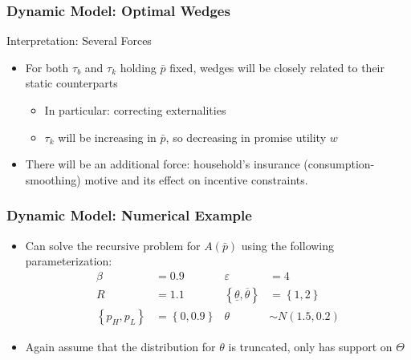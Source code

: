 \documentclass{beamer}
\begin{document}
\begin{frame}
    \frametitle{Dynamic Model: Optimal Wedges}

    Interpretation: Several Forces 
    \begin{itemize}
        \item For both \( \tau_b \) and \( \tau_k \) holding \( \bar{p} \) fixed, wedges will be closely related to their static counterparts
        \begin{itemize}
            \item In particular: correcting externalities 
            \item \( \tau_k \) will be increasing in \( \bar{p} \), so decreasing in promise utility \( w \)
        \end{itemize}
        \item There will be an additional force: household's insurance (consumption-smoothing) motive and its effect on incentive constraints. 
    \end{itemize}

\end{frame}

\begin{frame}
    \frametitle{Dynamic Model: Numerical Example}

    \begin{itemize}
        \item Can solve the recursive problem for \( A\left( \bar{p} \right) \) using the following parameterization: 
        \begin{align*}
            \beta&=0.9&\varepsilon&=4\\R&=1.1&\left\{ \underline{\theta},\overline{\theta}\right\} &=\left\{ 1,2\right\} \\\left\{ p_{H},p_{L}\right\} &=\left\{ 0,0.9\right\} &\theta&\sim N\left(1.5,0.2\right)
        \end{align*}
        \item Again assume that the distribution for \( \theta \) is truncated, only has support on \( \Theta \)
    \end{itemize}

\end{frame}
\end{document}
